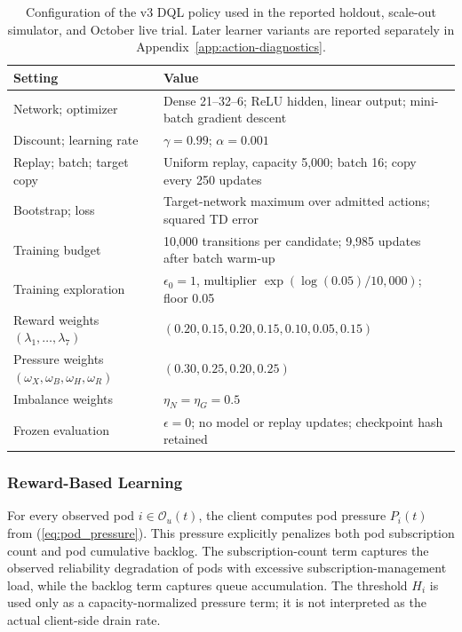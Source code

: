 \documentclass[manuscript]{acmart}
\begin{document}
\begin{table}[!htbp]
\centering\small
\caption{Configuration of the v3 DQL policy used in the reported holdout,
scale-out simulator, and October live trial. Later learner variants are
reported separately in Appendix~\ref{app:action-diagnostics}.}
\label{tab:dql-configuration}
\begin{tabular}{p{}p{}}
\toprule
Setting & Value\\
\midrule
Network; optimizer & Dense 21--32--6; ReLU hidden, linear output; mini-batch gradient descent\\
Discount; learning rate & $\gamma=0.99$; $\alpha=0.001$\\
Replay; batch; target copy & Uniform replay, capacity 5,000; batch 16; copy every 250 updates\\
Bootstrap; loss & Target-network maximum over admitted actions; squared TD error\\
Training budget & 10,000 transitions per candidate; 9,985 updates after batch warm-up\\
Training exploration & $\epsilon_0=1$, multiplier $\exp(\log(0.05)/10{,}000)$; floor 0.05\\
Reward weights $(\lambda_1,\ldots,\lambda_7)$ & $(0.20,0.15,0.20,0.15,0.10,0.05,0.15)$\\
Pressure weights $(\omega_X,\omega_B,\omega_H,\omega_R)$ & $(0.30,0.25,0.20,0.25)$\\
Imbalance weights & $\eta_N=\eta_G=0.5$\\
Frozen evaluation & $\epsilon=0$; no model or replay updates; checkpoint hash retained\\
\bottomrule
\end{tabular}
\end{table}

\subsubsection{Reward-Based Learning}

For every observed pod $i\in\mathcal{O}_u(t)$, the client computes pod pressure
$P_i(t)$ from (\ref{eq:pod_pressure}). This pressure explicitly penalizes both
pod subscription count and pod cumulative backlog. The subscription-count term
captures the observed reliability degradation of pods with excessive
subscription-management load, while the backlog term captures queue
accumulation. The threshold $H_i$ is used only as a capacity-normalized pressure
term; it is not interpreted as the actual client-side drain rate.
\end{document}
